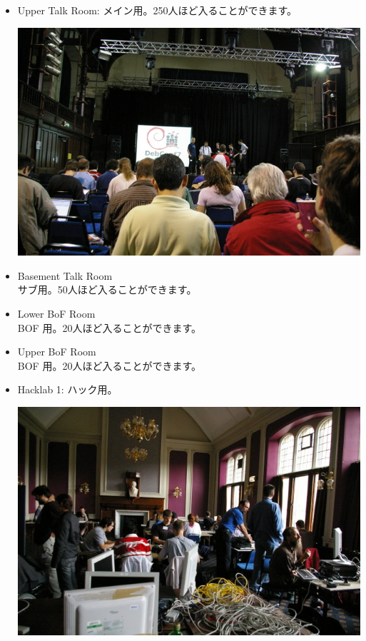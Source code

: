 \documentclass[mingoth,a4paper]{jsarticle}
\begin{document}
\begin{itemize}
  \item Upper Talk Room: 	メイン用。250人ほど入ることができます。\\
	\begin{minipage}{0.4\hsize}
	\includegraphics[width=0.8\hsize]{image200706/debconf7-upper-talk.jpg}
	\end{minipage}
  \item Basement Talk Room\\
	サブ用。50人ほど入ることができます。
  \item Lower BoF Room\\
	BOF 用。20人ほど入ることができます。
  \item Upper BoF Room\\
	BOF 用。20人ほど入ることができます。
  \item Hacklab 1: 	ハック用。\\
	\begin{minipage}{0.4\hsize}
	\includegraphics[width=0.8\hsize]{image200706/debconf7-hacklab00.jpg}
	\end{minipage}


\end{itemize}
\end{document}
